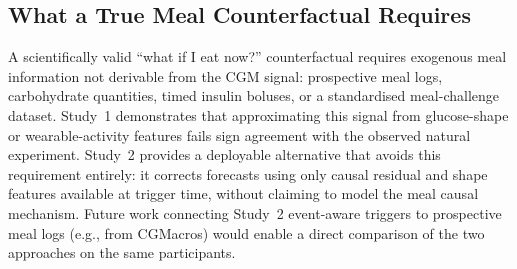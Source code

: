 \subsection{What a True Meal Counterfactual Requires}
\label{subsec:discuss_true_counterfactual}

A scientifically valid ``what if I eat now?'' counterfactual requires exogenous
meal information not derivable from the CGM signal: prospective meal logs,
carbohydrate quantities, timed insulin boluses, or a standardised meal-challenge
dataset.
Study~1 demonstrates that approximating this signal from glucose-shape or
wearable-activity features fails sign agreement with the observed natural
experiment.
Study~2 provides a deployable alternative that avoids this requirement entirely:
it corrects forecasts using only causal residual and shape features available
at trigger time, without claiming to model the meal causal mechanism.
Future work connecting Study~2 event-aware triggers to prospective meal logs
(e.g., from CGMacros) would enable a direct comparison of the two approaches
on the same participants.
